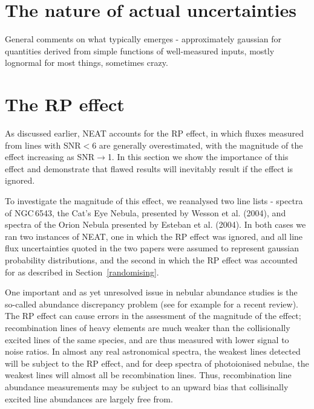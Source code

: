 \documentclass[useAMS,usenatbib]{mn2e}
\begin{document}


\section{The nature of actual uncertainties}

General comments on what typically emerges - approximately gaussian for quantities derived from simple functions of well-measured inputs, mostly lognormal for most things, sometimes crazy.

\section{The RP effect}

As discussed earlier, NEAT accounts for the RP effect, in which fluxes measured from lines with SNR$<$6 are generally overestimated, with the magnitude of the effect increasing as SNR$\to$1.  In this section we show the importance of this effect and demonstrate that flawed results will inevitably result if the effect is ignored.

To investigate the magnitude of this effect, we reanalysed two line lists - spectra of NGC\,6543, the Cat's Eye Nebula, presented by Wesson et al. (2004), and spectra of the Orion Nebula presented by Esteban et al. (2004).  In both cases we ran two instances of NEAT, one in which the RP effect was ignored, and all line flux uncertainties quoted in the two papers were assumed to represent gaussian probability distributions, and the second in which the RP effect was accounted for as described in Section~\ref{randomising}.

One important and as yet unresolved issue in nebular abundance studies is the so-called abundance discrepancy problem (see for example \citet{2006IAUS..234..219L} for a recent review).  The RP effect can cause errors in the assessment of the magnitude of the effect; recombination lines of heavy elements are much weaker than the collisionally excited lines of the same species, and are thus measured with lower signal to noise ratios.  In almost any real astronomical spectra, the weakest lines detected will be subject to the RP effect, and for deep spectra of photoionised nebulae, the weakest lines will almost all be recombination lines.  Thus, recombination line abundance measurements may be subject to an upward bias that collisinally excited line abundances are largely free from.
\end{document}
